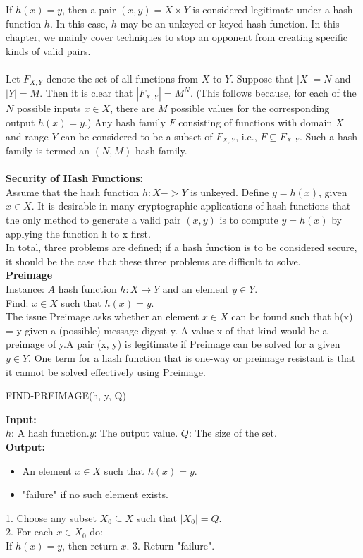\documentclass[11pt]{article}
\begin{document}
If $h(x) = y$, then a pair $(x, y) = X \times Y$ is considered legitimate under a hash function $h$. In this case, $h$ may be an unkeyed or keyed hash function. In this chapter, we mainly cover techniques to stop an opponent from creating specific kinds of valid pairs.\\\\
Let $F_{X,Y}$ denote the set of all functions from $X$ to $Y$. Suppose that $|X| = N$ and $|Y| = M$. Then it is clear that $|F_{X,Y}| = M^N$. (This follows because, for each of the $N$ possible inputs $x \in X$, there are $M$ possible values for the corresponding output $h(x) = y$.) Any hash family $F$ consisting of functions with domain $X$ and range $Y$ can be considered to be a subset of $F_{X,Y}$, i.e., $F \subseteq F_{X,Y}$. Such a hash family is termed an $(N, M)$-hash family.\\\\
\textbf{Security of Hash Functions:}\\
Assume that the hash function $h: X -> Y$ is unkeyed. Define $y = h(x)$, given $x \in X$. It is desirable in many cryptographic applications of hash functions that the only method to generate a valid pair $(x, y)$ is to compute $y = h(x)$ by applying the function h to x first.\\
In total, three problems are defined; if a hash function is to be
considered secure, it should be the case that these three problems are difficult to solve.\\
\newpage
\textbf{Preimage}\\
Instance: $A$ hash function $h : X \rightarrow Y$ and an element $y \in Y.$\\
Find: $x \in X$ such that $h(x) = y.$\\
The issue Preimage asks whether an element $x \in X$ can be found such that h(x) = y given a (possible) message digest y. A value x of that kind would be a preimage of y.A pair (x, y) is legitimate if Preimage can be solved for a given $y \in Y$. One term for a hash function that is one-way or preimage resistant is that it cannot be solved effectively using Preimage.\\
\begin{algorithm}
\caption{FIND-PREIMAGE(h, y, Q)}
\label{alg:find-preimage}
\textbf{Input:}\\
     $h$: A hash function.\hspace{5pt}$y$: The output value.
     \hspace{5pt}$Q$: The size of the set.\\
\textbf{Output:}
\begin{itemize}
    \item An element $x \in X$ such that $h(x) = y$.
    \item "failure" if no such element exists.
\end{itemize}

1. Choose any subset $X_0 \subseteq X$ such that $|X_0| = Q$.\\
2. For each $x \in X_0$ do:\\    
        If $h(x) = y$, then return $x$.    
3. Return "failure".
\end{algorithm}\\
\end{document}

